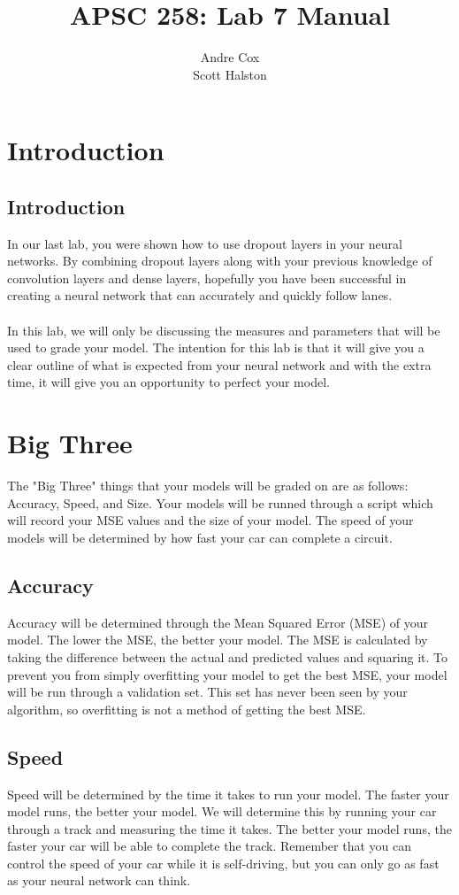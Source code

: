 \documentclass[11pt]{report}
\title{APSC 258: Lab 7 Manual}
\author{Andre Cox \\ Scott Halston}
\begin{document}
\maketitle
\tableofcontents

\clearpage

\chapter{Introduction}
\section{Introduction}
In our last lab, you were shown how to use dropout layers in your neural networks. By combining dropout layers along with your previous knowledge of convolution layers and dense layers, hopefully you have been successful in creating a neural network that can accurately and quickly follow lanes.
\\ \\
In this lab, we will only be discussing the measures and parameters that will be used to grade your model. The intention for this lab is that it will give you a clear outline of what is expected from your neural network and with the extra time, it will give you an opportunity to perfect your model.

\chapter{Big Three}
The "Big Three" things that your models will be graded on are as follows:
    Accuracy, Speed, and Size.
Your models will be runned through a script which will record your MSE values and the size of your model. The speed of your models will be determined by how fast your car can complete a circuit.

\section{Accuracy}
Accuracy will be determined through the Mean Squared Error (MSE) of your model. The lower the MSE, the better your model. The MSE is calculated by taking the difference between the actual and predicted values and squaring it. To prevent you from simply overfitting your model to get the best MSE, your model will be run through a validation set. This set has never been seen by your algorithm, so overfitting is not a method of getting the best MSE.

\section{Speed}
Speed will be determined by the time it takes to run your model. The faster your model runs, the better your model. We will determine this by running your car through a track and measuring the time it takes. The better your model runs, the faster your car will be able to complete the track. Remember that you can control the speed of your car while it is self-driving, but you can only go as fast as your neural network can think. 
\end{document}
